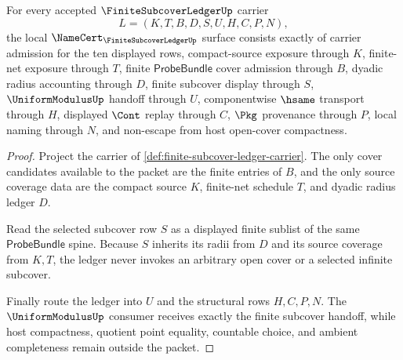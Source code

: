 \begin{theorem}
\label{thm:finite-subcover-ledger-obligations}
For every accepted $\FiniteSubcoverLedgerUp$ carrier
$$
L=(K,T,B,D,S,U,H,C,P,N),
$$
the local $\NameCert_{\FiniteSubcoverLedgerUp}$ surface consists exactly of carrier admission for the ten displayed rows, compact-source exposure through $K$, finite-net exposure through $T$, finite $\mathsf{ProbeBundle}$ cover admission through $B$, dyadic radius accounting through $D$, finite subcover display through $S$, $\UniformModulusUp$ handoff through $U$, componentwise $\hsame$ transport through $H$, displayed $\Cont$ replay through $C$, $\Pkg$ provenance through $P$, local naming through $N$, and non-escape from host open-cover compactness.
\end{theorem}
\begin{proof}
Project the carrier of \autoref{def:finite-subcover-ledger-carrier}. The only cover candidates available to the packet are the finite entries of $B$, and the only source coverage data are the compact source $K$, finite-net schedule $T$, and dyadic radius ledger $D$.

Read the selected subcover row $S$ as a displayed finite sublist of the same $\mathsf{ProbeBundle}$ spine. Because $S$ inherits its radii from $D$ and its source coverage from $K,T$, the ledger never invokes an arbitrary open cover or a selected infinite subcover.

Finally route the ledger into $U$ and the structural rows $H,C,P,N$. The $\UniformModulusUp$ consumer receives exactly the finite subcover handoff, while host compactness, quotient point equality, countable choice, and ambient completeness remain outside the packet.
\end{proof}



